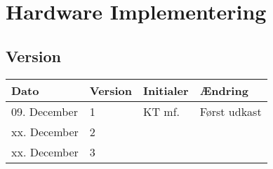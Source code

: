 \chapter{Hardware Implementering}\label{ch:hwimpl}
\section*{Version}
\begin{table}[h]
	\centering
	\begin{tabularx}{\textwidth - 2cm}{|l|l|l|X|}
	\hline
	Dato			& Version			& Initialer 		& Ændring										\\ \hline
	09. December	& 1 				& KT mf.	 		& Først udkast			\\ \hline
	xx. December	& 2 				& 			 		& 						\\ \hline
	xx. December	& 3 				& 			 		& 						\\ \hline
	\end{tabularx}
\end{table}
\clearpage

\clearpage


